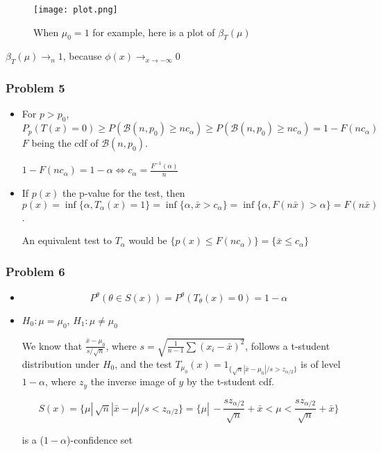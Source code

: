 \documentclass[12pt]{article}
\newcommand{\Q}[1]{\subsubsection*{Problem #1}}
\begin{document}
\begin{figure}[!h]
    \centering
    \texttt{[image: plot.png]}
    \caption{When $\mu_0 = 1$ for example, here is a plot of $\beta_T(\mu)$}
    \label{fig:awesome_image}
\end{figure}

$\beta_T(\mu) \rightarrow_n 1$, because $\phi(x) \rightarrow_{x \rightarrow -\infty} 0$

\Q{5}

\begin{itemize}
\item For $p > p_0$, $P_p(T(x) = 0) \geq P( \mathcal B(n, p_0) \ge n c_{\alpha}) \ge P( \mathcal B(n, p_0) \ge n c_{\alpha}) = 1 - F(n c_{\alpha})$
$F$ being the cdf of $\mathcal B(n, p_0)$.


$ 1 - F(n c_{\alpha}) = 1 - \alpha \iff c_{\alpha} = \frac{F^{-1}(\alpha)}{n} $

\item If $p(x)$ the p-value for the test, then $$p(x) = \inf \{ \alpha, T_\alpha(x) = 1 \} = \inf  \{ \alpha, \bar x > c_{\alpha} \} = \inf  \{ \alpha, F(n \bar x) > \alpha \} = F(n \bar x)$$. 

An equivalent test to $T_{\alpha}$ would be $\{p(x) \le F(nc_{\alpha})\} = \{\bar x \le c_{\alpha}\}$

\end{itemize}


\Q{6}
\begin{itemize}
\item $$P^{\theta}(\theta \in S(x)) = P^{\theta}(T_{\theta}(x) = 0) = 1 - \alpha$$

\item 

$H_0: \mu = \mu_0$,
$H_1: \mu \ne \mu_0$

We know that $\frac{\bar x - \mu_0}{s / \sqrt n}$, where $s = \sqrt {\frac1 {n-1} \sum (x_i - \bar x)^2}$, follows a t-student distribution under $H_0$, and the test
$T_{\mu_0}(x) = 1_{\{ \sqrt n |\bar x - \mu_0| / s > z_{\alpha/2} \} }$ is of level $1 - \alpha$, where $z_{y}$ the inverse image of $y$ by the t-student cdf.

$$S(x) = \{ \mu |\, \sqrt n |\bar x - \mu| / s < z_{\alpha /2} \} = \{ \mu |\,  -\frac{s z_{\alpha /2}}{\sqrt n} + \bar x < \mu < \frac{s z_{\alpha /2}}{\sqrt n} + \bar x  \} $$ 

is a ($1-\alpha$)-confidence set

\end{itemize}
\end{document}
